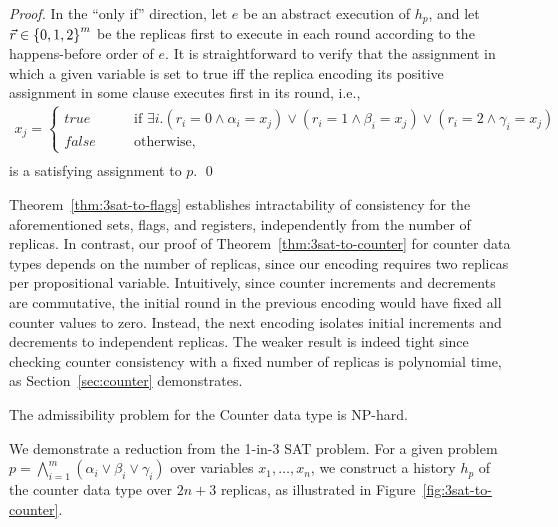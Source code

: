 \begin{proof}
  In the “only if” direction, let $e$ be an abstract execution of $h_p$, and let $\vec{r} \in {\{{0,1,2}\}}^m$ be the replicas first to execute in each round according to the happens-before order of $e$. It is straightforward to verify that the assignment in which a given variable is set to true if{f} the replica encoding its positive assignment in some clause executes first in its round, i.e.,
\vspace{-1mm}
  \begin{align*}
    x_j = \left\{
    \begin{array}{ll}
      \mathit{true} \qquad & \text{ if } \exists i. (r_i = 0 \land \alpha_i = x_j) \lor (r_i = 1 \land \beta_i = x_j) \lor (r_i = 2 \land \gamma_i = x_j) \\
      \mathit{false} & \text{ otherwise,}
    \end{array}
    \right. \\[-7mm]
  \end{align*}
  is a satisfying assignment to $p$. \qed
\vspace{-1mm}
\end{proof}

Theorem~\ref{thm:3sat-to-flags} establishes intractability of consistency for the aforementioned sets, flags, and registers, independently from the number of replicas. In contrast, our proof of Theorem~\ref{thm:3sat-to-counter} for counter data types depends on the number of replicas, since our encoding requires two replicas per propositional variable. Intuitively, since counter increments and decrements are commutative, the initial round in the previous encoding would have fixed all counter values to zero. Instead, the next encoding isolates initial increments and decrements to independent replicas. The weaker result is indeed tight since checking counter consistency with a fixed number of replicas is polynomial time, as Section~\ref{sec:counter} demonstrates.

\vspace{-1mm}
\begin{theorem}
  \label{thm:3sat-to-counter}

  The admissibility problem for the Counter data type is NP-hard.

\vspace{-1mm}
\end{theorem}



    We demonstrate a reduction from the 1-in-3 SAT problem. For a given problem $p = \bigwedge_{i=1}^{m} (\alpha_i \lor \beta_i \lor \gamma_i)$ over variables $x_1, \ldots, x_n$, we construct a history $h_p$ of the counter data type over $2n+3$ replicas, as illustrated in Figure~\ref{fig:3sat-to-counter}.

